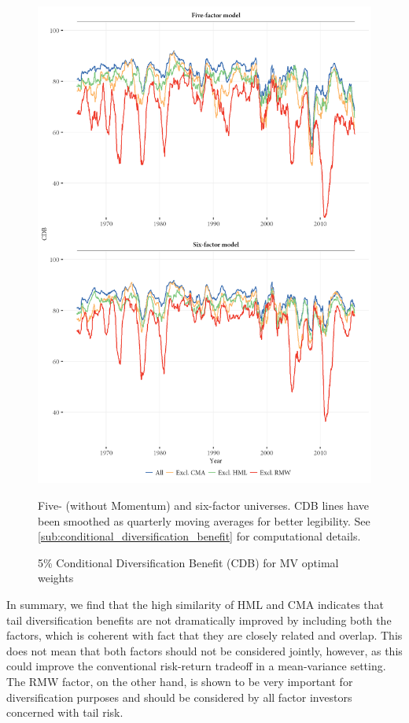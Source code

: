 \begin{figure}[htbp]
  \centering
  \footnotesize
  \includegraphics[width=\textwidth]{graphics/cdb/MV.png}
  \caption{5\% Conditional Diversification Benefit (CDB) for MV optimal weights}

  \begin{longcaption}
    Five- (without Momentum) and six-factor universes. CDB lines have been smoothed as quarterly moving averages for better legibility. See \autoref{sub:conditional_diversification_benefit} for computational details.
  \end{longcaption}
  \label{fig:mv_cdb}
\end{figure}



In summary, we find that the high similarity of HML and CMA indicates that tail diversification benefits are not dramatically improved by including both the factors, which is coherent with fact that they are closely related and overlap. This does not mean that both factors should not be considered jointly, however, as this could improve the conventional risk-return tradeoff in a mean-variance setting. The RMW factor, on the other hand, is shown to be very important for diversification purposes and should be considered by all factor investors concerned with tail risk.


